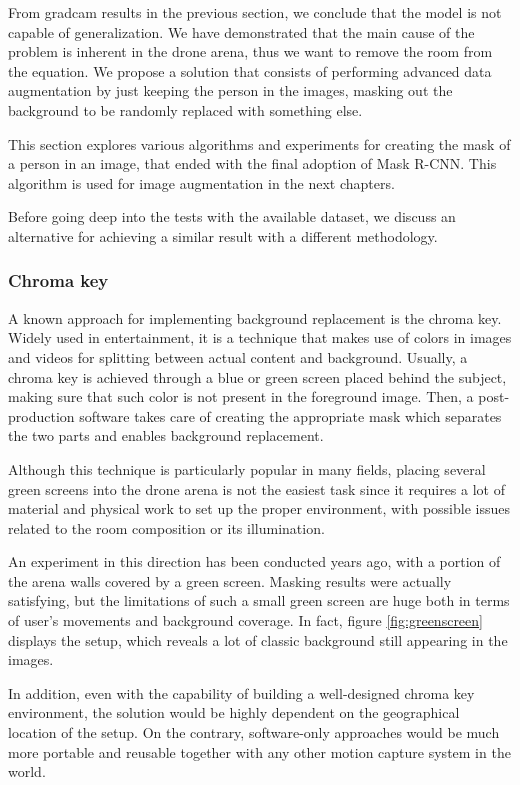 From \gls{gradcam} results in the previous section, we conclude that the model is not capable of generalization. We have demonstrated that the main cause of the problem is inherent in the drone arena, thus we want to remove the room from the equation. We propose a solution that consists of performing advanced data augmentation by just keeping the person in the images, masking out the background to be randomly replaced with something else.

This section explores various algorithms and experiments for creating the mask of a person in an image, that ended with the final adoption of Mask R-CNN. This algorithm is used for image augmentation in the next chapters.

\medskip

Before going deep into the tests with the available dataset, we discuss an alternative for achieving a similar result with a different methodology.

\subsubsection*{Chroma key}

A known approach for implementing background replacement is the chroma key. Widely used in entertainment, it is a technique that makes use of colors in images and videos for splitting between actual content and background. Usually, a chroma key is achieved through a blue or green screen placed behind the subject, making sure that such color is not present in the foreground image. Then, a post-production software takes care of creating the appropriate mask which separates the two parts and enables background replacement.

Although this technique is particularly popular in many fields, placing several green screens into the drone arena is not the easiest task since it requires a lot of material and physical work to set up the proper environment, with possible issues related to the room composition or its illumination.

An experiment in this direction has been conducted years ago, with a portion of the arena walls covered by a green screen. Masking results were actually satisfying, but the limitations of such a small green screen are huge both in terms of user's movements and background coverage. In fact, figure \ref{fig:greenscreen} displays the setup, which reveals a lot of classic background still appearing in the images.

In addition, even with the capability of building a well-designed chroma key environment, the solution would be highly dependent on the geographical location of the setup. On the contrary, software-only approaches would be much more portable and reusable together with any other motion capture system in the world.

